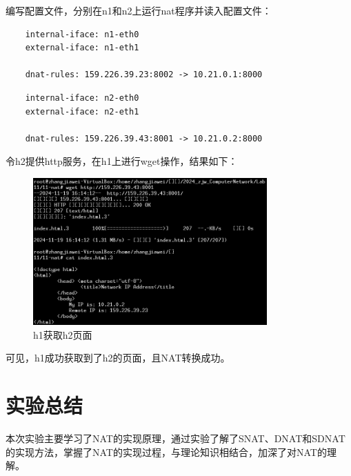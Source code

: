 \documentclass[UTF8]{report}
\begin{document}
编写配置文件，分别在n1和n2上运行nat程序并读入配置文件：

\begin{lstlisting}
    internal-iface: n1-eth0
    external-iface: n1-eth1
    
    dnat-rules: 159.226.39.23:8002 -> 10.21.0.1:8000
\end{lstlisting}

\begin{lstlisting}
    internal-iface: n2-eth0
    external-iface: n2-eth1
    
    dnat-rules: 159.226.39.43:8001 -> 10.21.0.2:8000
\end{lstlisting}

令h2提供http服务，在h1上进行wget操作，结果如下：

\begin{figure}[H]
    \centering
    \includegraphics[width=0.8\textwidth]{sdnat_html_h1.png}
    \caption{h1获取h2页面}
\end{figure}

可见，h1成功获取到了h2的页面，且NAT转换成功。

\section{实验总结}

本次实验主要学习了NAT的实现原理，通过实验了解了SNAT、DNAT和SDNAT的实现方法，掌握了NAT的实现过程，与理论知识相结合，加深了对NAT的理解。
\end{document}
